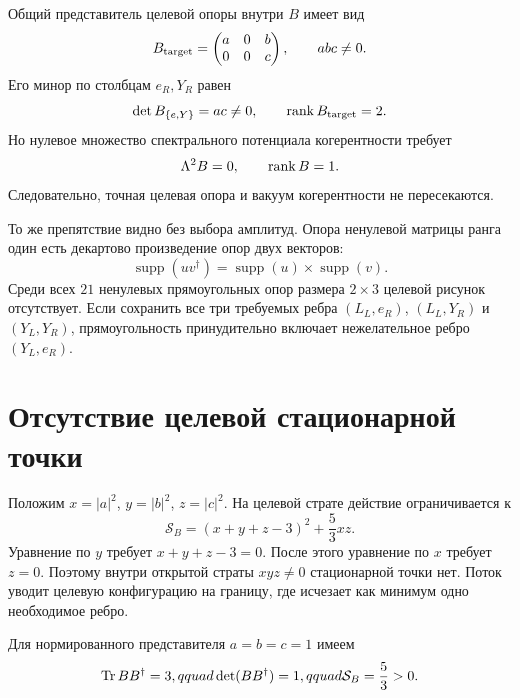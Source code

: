 Общий представитель целевой опоры внутри $B$ имеет вид
\begin{equation}
 B_{\rm target}
 =\begin{pmatrix}a&0&b\\0&0&c\end{pmatrix},
 \qquad abc\ne0.
 \label{eq:v7-full-graph-target-field}
\end{equation}
Его минор по столбцам $e_R,Y_R$ равен
\begin{equation}
 \det B_{\{e,Y\}}=ac\ne0,
 \qquad \operatorname{rank} B_{\rm target}=2.
 \label{eq:v7-full-graph-target-rank-two}
\end{equation}
Но нулевое множество спектрального потенциала когерентности требует
\begin{equation}
 \Lambda^2B=0,
 \qquad \operatorname{rank} B=1.
 \label{eq:v7-full-graph-coherence-rank-one}
\end{equation}
Следовательно, точная целевая опора и вакуум когерентности не пересекаются.

То же препятствие видно без выбора амплитуд. Опора ненулевой матрицы ранга
один есть декартово произведение опор двух векторов:
\begin{equation}
 \operatorname{supp}(uv^\dagger)
 =\operatorname{supp}(u)\times\operatorname{supp}(v).
 \label{eq:v7-full-graph-rank-one-rectangle}
\end{equation}
Среди всех $21$ ненулевых прямоугольных опор размера $2\times3$ целевой
рисунок отсутствует. Если сохранить все три требуемых ребра
$(L_L,e_R)$, $(L_L,Y_R)$ и $(Y_L,Y_R)$, прямоугольность принудительно
включает нежелательное ребро $(Y_L,e_R)$.

\section{Отсутствие целевой стационарной точки}

Положим $x=|a|^2$, $y=|b|^2$, $z=|c|^2$. На целевой страте действие
ограничивается к
\begin{equation}
 \mathcal S_B
 =(x+y+z-3)^2+\frac53xz.
 \label{eq:v7-full-graph-target-restricted-action}
\end{equation}
Уравнение по $y$ требует $x+y+z-3=0$. После этого уравнение по $x$
требует $z=0$. Поэтому внутри открытой страты $xyz\ne0$ стационарной
точки нет. Поток уводит целевую конфигурацию на границу, где исчезает как
минимум одно необходимое ребро.

Для нормированного представителя $a=b=c=1$ имеем
\begin{equation}
 \operatorname{Tr} BB^\dagger=3,qquad
 \det(BB^\dagger)=1,qquad
 \mathcal S_B=\frac53>0.
 \label{eq:v7-full-graph-target-energy}
\end{equation}

